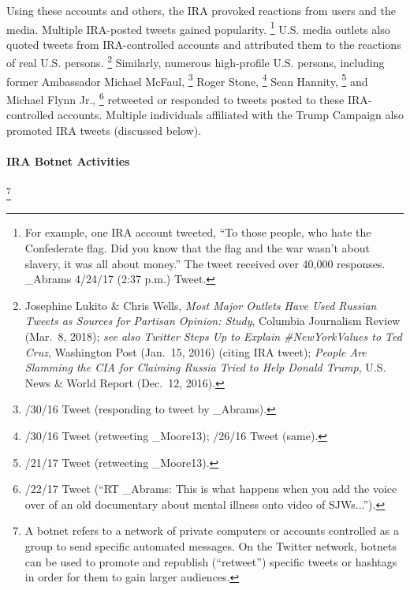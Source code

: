 Using these accounts and others, the IRA provoked reactions from users and the media.
Multiple IRA-posted tweets gained popularity.%
\footnote{For example, one IRA account tweeted, “To those people, who hate the Confederate flag.
Did you know that the flag and the war wasn't about slavery, it was all about money.”
The tweet received over 40,000 responses.
\@Jenn\_Abrams 4/24/17 (2:37 p.m.) Tweet.}
U.S. media outlets also quoted tweets from IRA-controlled accounts and attributed them to the reactions of real U.S. persons.%
\footnote{Josephine Lukito \& Chris Wells, \textit{Most Major Outlets Have Used Russian Tweets as Sources for Partisan Opinion: Study}, Columbia Journalism Review (Mar.~8, 2018);
\textit{see also Twitter Steps Up to Explain \#NewYorkValues to Ted Cruz}, Washington Post (Jan.~15, 2016) (citing IRA tweet);
\textit{People Are Slamming the CIA for Claiming Russia Tried to Help Donald Trump}, U.S. News \& World Report (Dec.~12, 2016).}
Similarly, numerous high-profile U.S. persons, including former Ambassador Michael McFaul,%
\footnote{/30/16 Tweet (responding to tweet by \@Jenn\_Abrams).} Roger Stone,%
\footnote{/30/16 Tweet (retweeting \@Pamela\_Moore13);
/26/16 Tweet (same).}
Sean Hannity,%
\footnote{/21/17 Tweet (retweeting \@Pamela\_Moore13).}
and Michael Flynn Jr.,%
\footnote{/22/17 Tweet (“RT \@Jenn\_Abrams: This is what happens when you add the voice over of an old documentary about mental illness onto video of SJWs...”).}
retweeted or responded to tweets posted to these IRA-controlled accounts.
Multiple individuals affiliated with the Trump Campaign also promoted IRA tweets (discussed below).

\paragraph{IRA Botnet Activities}

\footnote{A botnet refers to a network of private computers or accounts controlled as a group to send specific automated messages.
On the Twitter network, botnets can be used to promote and republish (“retweet”) specific tweets or hashtags in order for them to gain larger audiences.}

